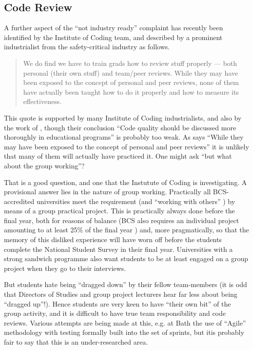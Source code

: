 \documentclass[sigconf]{acmart}
\begin{document}
\subsection{Code Review}
A further aspect of the ``not industry ready'' complaint has recently been identified by the Institute of Coding team, and described by a prominent industrialist from the safety-critical industry as follows.
\begin{quote}
We do find we have to train grads how to review stuff properly --- both personal (their own stuff) and team/peer reviews. While they may have been exposed to the concept of personal and peer reviews, none of them have actually been taught how to do it properly and how to measure its effectiveness. \cite{Chapman2018c}
\end{quote}
This quote is supported by many Institute of Coding industrialists, and also by the work of  \cite{Boerstleretal2018a}, though their conclusion ``Code quality should be discussed more thoroughly in educational programs'' is probably too weak. As \cite{Chapman2018c} says ``While they may have been exposed to the concept of personal and peer reviews'' it is unlikely that many of them will actually have practiced it.  One might ask ``but what about the group working''? 
\par
That is a good question, and one that the Instutute of Coding is investigating. A provisional answer lies in the nature of group working. Practically all BCS-accredited universities meet the requirement \cite[Requirement 2.3.1]{BCS2018a} (and ``working with others'' \cite[Requirement 2.3.2]{BCS2018a}) by means of a group practical project. This is practically always done before the final year, both for reasons of balance (BCS also requires an individual project amounting to at least 25\% of the final year \cite[Requirement 2.5.1]{BCS2018a}) and, more pragmatically, so that the memory of this disliked experience will have worn off before the students complete the National Student Survey in their final year. Universities with a strong sandwich programme also want students to be at least engaged on a group project when they go to their interviews.

But students hate being ``dragged down'' by their fellow team-members (it is odd that Directors of Studies and group project lecturers hear far less about being ``dragged up''!).  Hence students are very keen to have ``their own bit'' of the group activity, and it is difficult to have true team responsibility and code reviews.  Various attempts are being made at this, e.g. at Bath the use of ``Agile'' methodology with testing formally built into the  set of sprints, but itis probably fair to say that this is an under-researched area.
\end{document}
